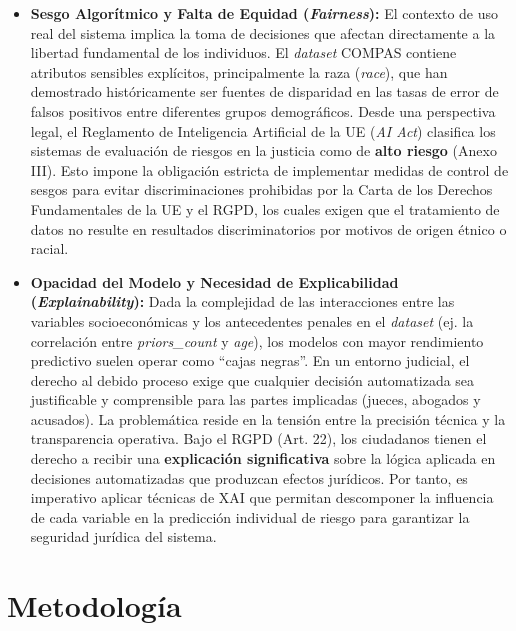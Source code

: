 \documentclass[11pt,a4paper]{article}
\begin{document}
\begin{itemize}
    \item \textbf{Sesgo Algorítmico y Falta de Equidad (\textit{Fairness}):} 
    El contexto de uso real del sistema implica la toma de decisiones que afectan directamente a la libertad fundamental de los individuos. El \textit{dataset} COMPAS contiene atributos sensibles explícitos, principalmente la raza (\textit{race}), que han demostrado históricamente ser fuentes de disparidad en las tasas de error de falsos positivos entre diferentes grupos demográficos. 
    Desde una perspectiva legal, el Reglamento de Inteligencia Artificial de la UE (\textit{AI Act}) clasifica los sistemas de evaluación de riesgos en la justicia como de \textbf{alto riesgo} (Anexo III). Esto impone la obligación estricta de implementar medidas de control de sesgos para evitar discriminaciones prohibidas por la Carta de los Derechos Fundamentales de la UE y el RGPD, los cuales exigen que el tratamiento de datos no resulte en resultados discriminatorios por motivos de origen étnico o racial.

    \item \textbf{Opacidad del Modelo y Necesidad de Explicabilidad (\textit{Explainability}):} 
    Dada la complejidad de las interacciones entre las variables socioeconómicas y los antecedentes penales en el \textit{dataset} (ej. la correlación entre \textit{priors\_count} y \textit{age}), los modelos con mayor rendimiento predictivo suelen operar como ``cajas negras''. En un entorno judicial, el derecho al debido proceso exige que cualquier decisión automatizada sea justificable y comprensible para las partes implicadas (jueces, abogados y acusados). 
    La problemática reside en la tensión entre la precisión técnica y la transparencia operativa. Bajo el RGPD (Art. 22), los ciudadanos tienen el derecho a recibir una \textbf{explicación significativa} sobre la lógica aplicada en decisiones automatizadas que produzcan efectos jurídicos. Por tanto, es imperativo aplicar técnicas de XAI que permitan descomponer la influencia de cada variable en la predicción individual de riesgo para garantizar la seguridad jurídica del sistema.
\end{itemize}


\section{Metodología}
\label{sec:metodologia}
\end{document}
